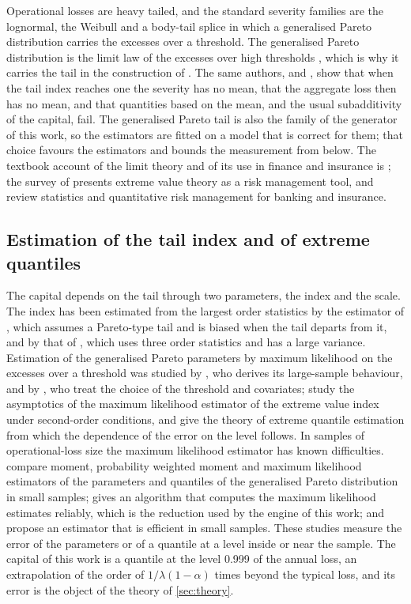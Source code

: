 Operational losses are heavy tailed, and the standard severity families are the lognormal, the Weibull and a body-tail splice in which a generalised Pareto distribution carries the excesses over a threshold.
The generalised Pareto distribution is the limit law of the excesses over high thresholds \citep{balkema1974,pickands1975}, which is why it carries the tail in the construction of \citet{chavez2006}. The same
authors, and \citet{neslehova2006}, show that when the tail index reaches one the severity has no mean, that the aggregate loss then has no mean, and that quantities based on the mean, and the usual
subadditivity of the capital, fail. The generalised Pareto tail is also the family of the generator of this work, so the estimators are fitted on a model that is correct for them; that choice favours the estimators and bounds the
measurement from below. The textbook account of the limit theory and of its use in finance and insurance is \citet{embrechts1997}; the survey of \citet{embrechts1999} presents extreme value theory as a risk management tool,
and \citet{embrechts2014} review statistics and quantitative risk management for banking and insurance.

\subsection{Estimation of the tail index and of extreme quantiles}
\label{sec:rw-estimation}

The capital depends on the tail through two parameters, the index and the scale. The index has been estimated from the largest order statistics by the estimator of \citet{hill1975}, which assumes a Pareto-type tail and is biased
when the tail departs from it, and by that of \citet{pickands1975}, which uses three order statistics and has a large variance. Estimation of the generalised Pareto parameters by maximum likelihood on the excesses over a threshold was studied by
\citet{smith1987}, who derives its large-sample behaviour, and by \citet{davison1990}, who treat the choice of the threshold and covariates; \citet{drees2004} study the asymptotics of the maximum likelihood estimator of the extreme value index
under second-order conditions, and \citet{dehaan2006} give the theory of extreme quantile estimation from which the dependence of the error on the level follows. In samples of operational-loss size the maximum likelihood estimator has known difficulties.
\citet{hosking1987} compare moment, probability weighted moment and maximum likelihood estimators of the parameters and quantiles of the generalised Pareto distribution in small samples; \citet{grimshaw1993} gives an algorithm that
computes the maximum likelihood estimates reliably, which is the reduction used by the engine of this work; and \citet{zhang2009} propose an estimator that is efficient in small samples. These studies measure the error of the parameters
or of a quantile at a level inside or near the sample. The capital of this work is a quantile at the level 0.999 of the annual loss, an extrapolation of the order of $1/\lambda(1-\alpha)$ times beyond the typical loss, and its error is the
object of the theory of \cref{sec:theory}.

